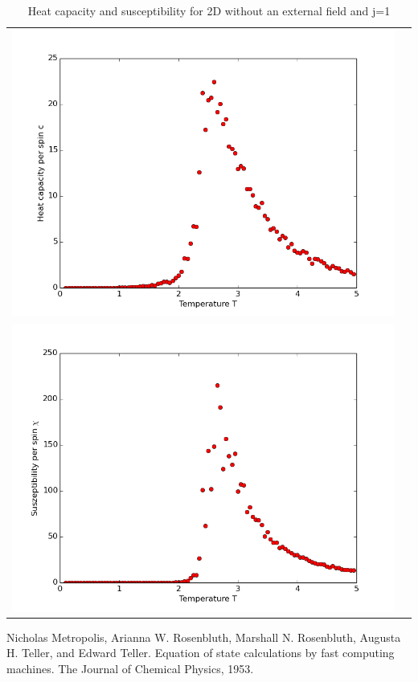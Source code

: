 \documentclass[12pt,a4paper,titlepage]{article}
\begin{document}
\begin{table}
\centering
\begin{tabular}{cc}
\includegraphics[width=13cm]{Plots/Heat_Capacitiy_2}\\
\includegraphics[width=13cm]{Plots/Suszeptibility_2} \\
\end{tabular} 
\caption{Heat capacity and susceptibility for 2D without an external field and j=1}
\end{table}








\begin{thebibliography}{9}



Nicholas Metropolis, Arianna W. Rosenbluth, Marshall N. Rosenbluth, Augusta H. Teller, and Edward
Teller. Equation of state calculations by fast computing machines. The Journal of Chemical Physics, 1953.



\end{thebibliography}
\end{document}
